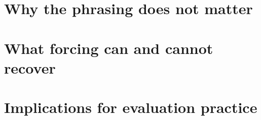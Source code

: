 \documentclass[12pt,a4paper,oneside]{report}
\newif\ifdraft
\newcommand{\writehere}[2]{%
  \ifdraft
    \begin{tcolorbox}[colback=yellow!8,colframe=orange!55,
                      boxrule=0.6pt,left=6pt,right=6pt,top=4pt,bottom=4pt]
    {\small\textbf{WRITE: #1}\\[2pt]#2}
    \end{tcolorbox}
  \fi}
\begin{document}
\section{Why the phrasing does not matter}

\writehere{2 paragraphs}{
First: interpret Table \ref{tab:variants}. What the intervention supplies is
permission to stop, not a better prompt, so elaborating the request adds cost
without adding information. The information the model needs is already in its own
trace.
\\[4pt]
Second: the cost caveat, and be careful here. Forcing's wall clock cost is
dominated by prefill, that is re reading the stored trace, because the forcing step
itself generates about five tokens. An implementation that kept the KV cache would
make forcing nearly free, so these timings are not an intrinsic cost of the method.}

\section{What forcing can and cannot recover}

\writehere{3 paragraphs}{
One: the two worked examples together. Problem 1, answer 588, where three of four
summaries contain genuine derived quantities and forcing yields 588. Problem 13,
answer 60, where the summaries are still setting up the problem and forcing yields
confident but wrong values of 124 and 184.
\\[4pt]
Two: the generalisation. Budget forcing recovers answers already latent in the
trace and cannot manufacture reasoning that has not occurred. Show that this single
statement accounts for all four findings: the gain is real because latent answers
are common, the gain is bounded because most failures are genuinely incomplete,
forcing is non destructive because a latent answer is stable under re elicitation,
and the phrasing is irrelevant because what is supplied is permission to conclude.
\\[4pt]
Three: where the headroom actually is. Only about a quarter of rescuable traces
mention the answer at all, so roughly three quarters of failures never derived it
and no extraction procedure could recover them. The remaining opportunity is in
generating reasoning, not reading it out.}

\section{Implications for evaluation practice}
\end{document}
